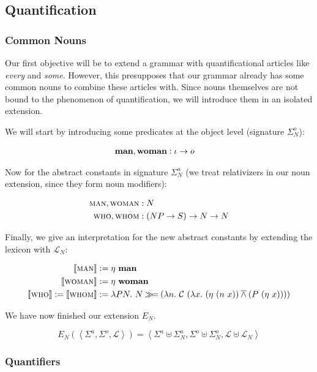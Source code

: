 \subsection{Quantification}

\subsubsection{Common Nouns}

Our first objective will be to extend a grammar with quantificational
articles like \textit{every} and \textit{some}. However, this presupposes
that our grammar already has some common nouns to combine these articles
with. Since nouns themselves are not bound to the phenomenon of
quantification, we will introduce them in an isolated extension.

We will start by introducing some predicates at the object level (signature
$\Sigma^o_N$):

\begin{align*}
  \textbf{man}, \textbf{woman} &: \iota \to o
\end{align*}

Now for the abstract constants in signature $\Sigma^a_N$ (we treat
relativizers in our noun extension, since they form noun modifiers):

\begin{align*}
  \textsc{man}, \textsc{woman} &: N \\
  \textsc{who}, \textsc{whom} &: (NP \to S) \to N \to N
\end{align*}

Finally, we give an interpretation for the new abstract constants by
extending the lexicon with $\mathcal{L}_N$:

\begin{align*}
  \lex{man}{\eta\ \obj{man}} \\
  \lex{woman}{\eta\ \obj{woman}} \\
  \sem{\abs{who}} := \sem{\abs{whom}} &:= \lambda P N.\ N \hsbind (\lambda n.\ \mathcal{C}\ (\lambda x.\ (\eta\ (n\ x)) \dand (P\ (\eta\ x))))
\end{align*}

We have now finished our extension $E_N$.

$$
E_N(\left< \Sigma^a, \Sigma^o, \mathcal{L} \right>) = \left< \Sigma^a \uplus
\Sigma^a_N, \Sigma^o \uplus \Sigma^o_N, \mathcal{L} \uplus \mathcal{L}_N \right>
$$


\subsubsection{Quantifiers}

